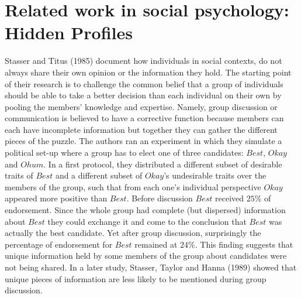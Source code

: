 \documentclass{article}
\begin{document}
\section{Related work in social psychology: Hidden Profiles} \label{socialpsychology}

Stasser and Titus (1985)\cite{stasser} document how individuals in social contexts, do not always share their own opinion or the information they hold. The starting point of their research is to challenge the common belief that a group of individuals should be able to take a better decision than each individual on their own by pooling the members' knowledge and expertise. Namely, group discussion or communication is believed to have a corrective function because members can each have incomplete information but together they can gather the different pieces of the puzzle. The authors ran an experiment in which they simulate a political set-up where a group has to elect one of three candidates: $Best$, $Okay$ and $Ohum$. In a first protocol, they distributed a different subset of desirable traits of $Best$ and a different subset of $Okay$'s undesirable traits over the members of the group, such that from each one's individual perspective $Okay$ appeared more positive than $Best$. Before discussion $Best$ received $25\%$ of endorsement. Since the whole group had complete (but dispersed) information about $Best$ they could exchange it and come to the conclusion that $Best$ was actually the best candidate. Yet after group discussion, surprisingly the percentage of endorsement for $Best$ remained at $24\%$. This finding suggests that unique information held by some members of the group about candidates were not being shared. In a later study, Stasser, Taylor and Hanna (1989)\cite{stasser89} showed that unique pieces of information are less likely to be mentioned during group discussion.  %
\end{document}
